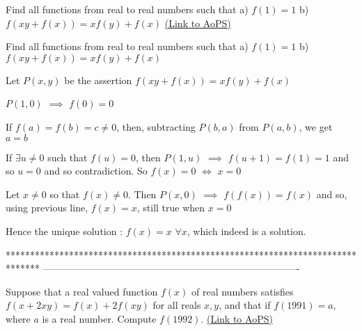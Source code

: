 \begin{problem}
	Find all functions from real to real numbers such that
a) $f(1)=1$
b)$f( xy + f(x))=xf(y)+f(x)$
	\flushright \href{https://artofproblemsolving.com/community/c6h590447}{(Link to AoPS)}
\end{problem}



\begin{solution}
	\begin{tcolorbox}Find all functions from real to real numbers such that
a) $f(1)=1$
b)$f( xy + f(x))=xf(y)+f(x)$\end{tcolorbox}
Let $P(x,y)$ be the assertion $f(xy+f(x))=xf(y)+f(x)$

$P(1,0)$ $\implies$ $f(0)=0$

If $f(a)=f(b)=c\ne 0$, then, subtracting $P(b,a)$ from $P(a,b)$, we get $a=b$

If $\exists u\ne 0$ such that $f(u)=0$, then $P(1,u)$ $\implies$ $f(u+1)=f(1)=1$ and so $u=0$ and so contradiction.
So $f(x)=0$ $\iff$ $x=0$

Let $x\ne 0$ so that $f(x)\ne 0$. Then $P(x,0)$ $\implies$ $f(f(x))=f(x)$ and so, using previous line, $f(x)=x$, still true when $x=0$

Hence the unique solution : $\boxed{f(x)=x}$ $\forall x$, which indeed is a solution.
\end{solution}
*******************************************************************************
-------------------------------------------------------------------------------

\begin{problem}
	Suppose that a real valued function $f(x)$ of real numbers satisfies
$f(x+2xy)=f(x)+2f(xy)$
for all reals $x,y$, and that if $f(1991)=a$, where $a$ is a real number. Compute $f(1992)$.
	\flushright \href{https://artofproblemsolving.com/community/c6h590448}{(Link to AoPS)}
\end{problem}




